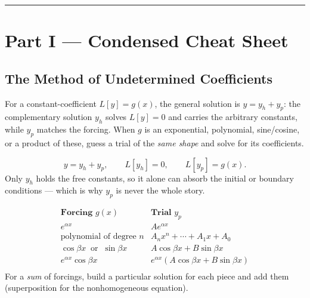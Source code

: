 \vspace{0.6em}
\hrule
\vspace{0.6em}

{}
\section*{Part I --- Condensed Cheat Sheet}
\setcounter{section}{10}   %

\subsection{The Method of Undetermined Coefficients}

For a constant-coefficient $L[y] = g(x)$, the general solution is
$y = y_h + y_p$: the complementary solution $y_h$ solves $L[y]=0$ and carries the
arbitrary constants, while $y_p$ matches the forcing. When $g$ is an exponential,
polynomial, sine/cosine, or a product of these, guess a trial of the \emph{same
shape} and solve for its coefficients.

\begin{formulabox}
\[ y = y_h + y_p, \qquad L[y_h] = 0, \qquad L[y_p] = g(x). \]
Only $y_h$ holds the free constants, so it alone can absorb the initial or
boundary conditions --- which is why $y_p$ is never the whole story.
\end{formulabox}

\begin{formulabox}
\[
\begin{array}{l|l}
\textbf{Forcing } g(x) & \textbf{Trial } y_p \\ \hline
e^{\alpha x} & A e^{\alpha x} \\
\text{polynomial of degree } n & A_n x^n + \cdots + A_1 x + A_0 \\
\cos\beta x \ \text{ or } \ \sin\beta x & A\cos\beta x + B\sin\beta x \\
e^{\alpha x}\cos\beta x & e^{\alpha x}(A\cos\beta x + B\sin\beta x) \\
\end{array}
\]
For a \emph{sum} of forcings, build a particular solution for each piece and add
them (superposition for the nonhomogeneous equation).
\end{formulabox}

